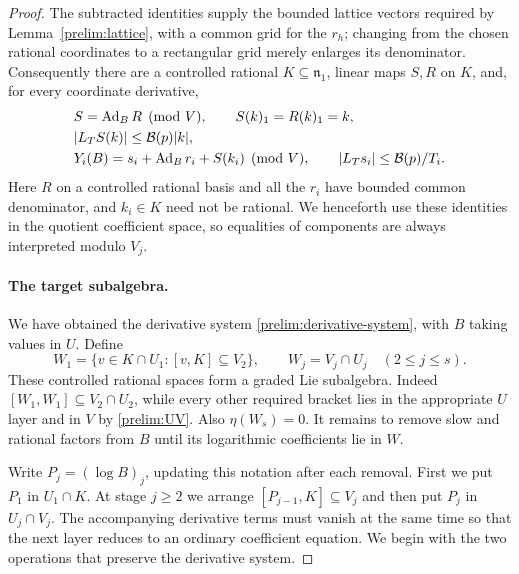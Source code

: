 \begin{proof}
The subtracted identities supply the bounded lattice vectors
required by Lemma~\ref{prelim:lattice}, with a common grid for
the $r_h$; changing from the chosen rational coordinates to a
rectangular grid merely enlarges its denominator.  Consequently
there are a controlled rational $K\subseteq\mathfrak n_1$,
linear maps $S,R$ on $K$, and, for every coordinate derivative,
\begin{equation}\label{prelim:derivative-system}
 \begin{split}
 &S=\operatorname{Ad}_B R\pmod V,\qquad S(k)_1=R(k)_1=k,\\
 &|L_TS(k)|\leq\mathcal B(p)|k|,\\
 &Y_i(B)=s_i+\operatorname{Ad}_Br_i+S(k_i)\pmod V,\qquad
 |L_Ts_i|\leq\mathcal B(p)/T_i.
 \end{split}
\end{equation}
Here $R$ on a controlled rational basis and all the $r_i$ have
bounded common denominator, and $k_i\in K$ need not be rational.
We henceforth use these identities in the quotient coefficient
space, so equalities of components are always interpreted modulo
$V_j$.

\paragraph{The target subalgebra.}
We have obtained the derivative system \eqref{prelim:derivative-system},
with $B$ taking values in $U$. Define
\[
 W_1=\{v\in K\cap U_1:[v,K]\subseteq V_2\},\qquad
 W_j=V_j\cap U_j\quad(2\leq j\leq s).
\]
These controlled rational spaces form a graded Lie subalgebra.
Indeed $[W_1,W_1]\subseteq V_2\cap U_2$, while every other
required bracket lies in the appropriate $U$ layer and in $V$
by \eqref{prelim:UV}. Also $\eta(W_s)=0$.
It remains to remove slow and rational factors from $B$ until its
logarithmic coefficients lie in $W$.

Write $P_j=(\log B)_j$, updating this notation after each removal.
First we put $P_1$ in $U_1\cap K$. At stage $j\ge2$ we arrange
$[P_{j-1},K]\subseteq V_j$ and then put $P_j$ in $U_j\cap V_j$.
The accompanying derivative terms must vanish at the same time so
that the next layer reduces to an ordinary coefficient equation.
We begin with the two operations that preserve the derivative system.


\end{proof}

